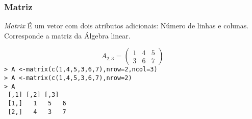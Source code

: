 \documentclass[handout]{beamer}
\begin{document}
  \begin{frame}
    \frametitle{Matriz}
    \begin{block}{\textit{Matrix}}
     É um vetor com dois atributos adicionais: Número de linhas e colunas. Corresponde a matriz da Álgebra linear. 
    \end{block}
\[A_{2,3}= \begin{pmatrix}
     1 &4 &5 \\
     3 & 6& 7
   \end{pmatrix} \]
\texttt{> A <-matrix(c(1,4,5,3,6,7),nrow=2,ncol=3)\\
> A <-matrix(c(1,4,5,3,6,7),nrow=2)\\
> A\\
  \hspace{20pt} ~[,1]~[,2]~[,3]\\
~[1,]  ~  1  ~  5 ~   6\\
~[2,]  ~  4 ~   3  ~  7
}
  \end{frame}
\end{document}
